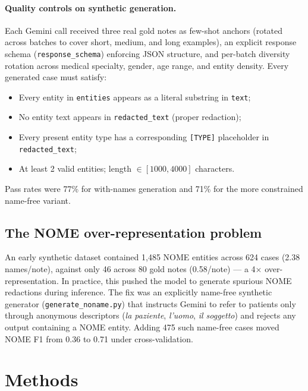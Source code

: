 \documentclass[11pt,a4paper]{article}
\begin{document}
\paragraph{Quality controls on synthetic generation.}
Each Gemini call received three real gold notes as few-shot anchors (rotated across batches to cover short, medium, and long examples), an explicit response schema (\texttt{response\_schema}) enforcing JSON structure, and per-batch diversity rotation across medical specialty, gender, age range, and entity density. Every generated case must satisfy:
\begin{itemize}[leftmargin=*,topsep=2pt,itemsep=0pt]
\item Every entity in \texttt{entities} appears as a literal substring in \texttt{text};
\item No entity text appears in \texttt{redacted\_text} (proper redaction);
\item Every present entity type has a corresponding \texttt{[TYPE]} placeholder in \texttt{redacted\_text};
\item At least 2 valid entities; length $\in [1000, 4000]$ characters.
\end{itemize}
Pass rates were 77\% for with-names generation and 71\% for the more constrained name-free variant.

\subsection{The NOME over-representation problem}

An early synthetic dataset contained 1{,}485 NOME entities across 624 cases (2.38 names/note), against only 46 across 80 gold notes (0.58/note) — a 4$\times$ over-representation. In practice, this pushed the model to generate spurious NOME redactions during inference. The fix was an explicitly name-free synthetic generator (\texttt{generate\_noname.py}) that instructs Gemini to refer to patients only through anonymous descriptors (\textit{la paziente}, \textit{l'uomo}, \textit{il soggetto}) and rejects any output containing a NOME entity. Adding 475 such name-free cases moved NOME F1 from 0.36 to 0.71 under cross-validation.

\section{Methods}
\label{sec:methods}
\end{document}
